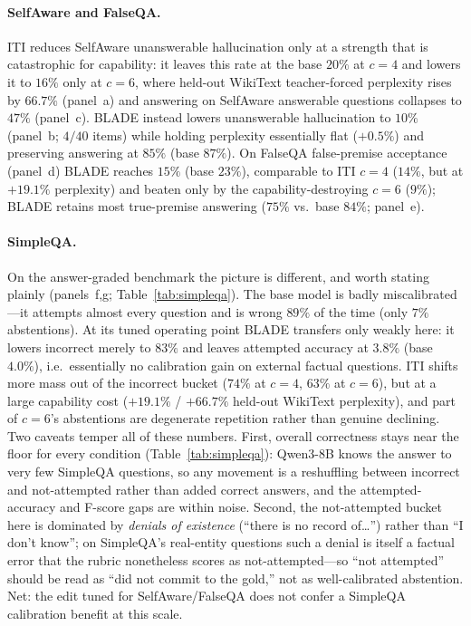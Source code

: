 \paragraph{SelfAware and FalseQA.} ITI reduces SelfAware unanswerable hallucination only at a strength
that is catastrophic for capability: it leaves this rate at the base $20\%$ at $c\!=\!4$ and lowers it
to $16\%$ only at $c\!=\!6$, where held-out WikiText teacher-forced perplexity rises by $66.7\%$ (panel~a) and
answering on SelfAware answerable questions collapses to $47\%$ (panel~c). BLADE instead lowers
unanswerable hallucination to $10\%$ (panel~b; $4/40$ items) while holding perplexity essentially flat
($+0.5\%$) and preserving answering at $85\%$ (base $87\%$). On FalseQA false-premise acceptance
(panel~d) BLADE reaches $15\%$ (base $23\%$), comparable to ITI $c\!=\!4$ ($14\%$, but at $+19.1\%$
perplexity) and beaten only by the capability-destroying $c\!=\!6$ ($9\%$); BLADE retains most
true-premise answering ($75\%$ vs.\ base $84\%$; panel~e).

\paragraph{SimpleQA.} On the answer-graded benchmark the picture is different, and worth stating plainly
(panels~f,g; Table~\ref{tab:simpleqa}). The base model is badly miscalibrated---it attempts almost every
question and is wrong $89\%$ of the time (only $7\%$ abstentions). At its tuned operating point BLADE
transfers only weakly here: it lowers incorrect merely to $83\%$ and leaves attempted accuracy at
$3.8\%$ (base $4.0\%$), i.e.\ essentially no calibration gain on external factual questions. ITI shifts
more mass out of the incorrect bucket ($74\%$ at $c\!=\!4$, $63\%$ at $c\!=\!6$), but at a large
capability cost ($+19.1\%$ / $+66.7\%$ held-out WikiText perplexity), and part of $c\!=\!6$'s abstentions are degenerate
repetition rather than genuine declining. Two caveats temper all of these numbers. First, overall
correctness stays near the floor for every condition (Table~\ref{tab:simpleqa}): Qwen3-8B knows the
answer to very few SimpleQA questions, so any movement is a reshuffling between incorrect and
not-attempted rather than added correct answers, and the attempted-accuracy and F-score gaps are within
noise. Second, the not-attempted bucket here is dominated by \emph{denials of existence} (``there is no
record of\dots'') rather than ``I don't know''; on SimpleQA's real-entity questions such a denial is
itself a factual error that the rubric nonetheless scores as not-attempted---so ``not attempted'' should
be read as ``did not commit to the gold,'' not as well-calibrated abstention. Net: the edit tuned for
SelfAware/FalseQA does not confer a SimpleQA calibration benefit at this scale.

